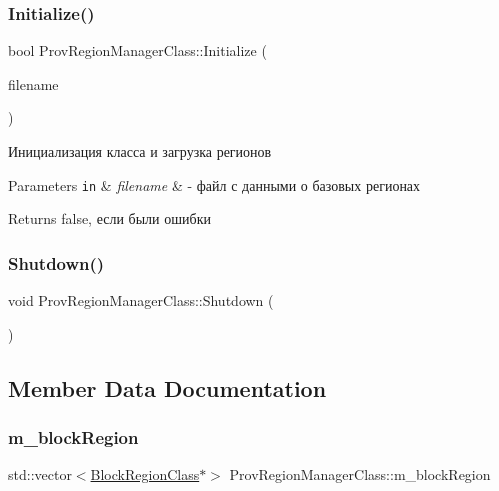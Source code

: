 \subsubsection{\texorpdfstring{Initialize()}{Initialize()}}
{\footnotesize\ttfamily bool Prov\+Region\+Manager\+Class\+::\+Initialize (\begin{DoxyParamCaption}\item[{\hyperlink{class_path_class}{Path\+Class} $\ast$}]{filename }\end{DoxyParamCaption})}



Инициализация класса и загрузка регионов 


\begin{DoxyParams}[1]{Parameters}
\mbox{\tt in}  & {\em filename} & -\/ файл с данными о базовых регионах \\
\hline
\end{DoxyParams}
\begin{DoxyReturn}{Returns}
false, если были ошибки 
\end{DoxyReturn}
\mbox{\label{class_prov_region_manager_class_a524eb11df226ed26ff043fb241707892}} 
\subsubsection{\texorpdfstring{Shutdown()}{Shutdown()}}
{\footnotesize\ttfamily void Prov\+Region\+Manager\+Class\+::\+Shutdown (\begin{DoxyParamCaption}{ }\end{DoxyParamCaption})}



\subsection{Member Data Documentation}
\mbox{\label{class_prov_region_manager_class_a9efe4cf012f00b316ce05fe588454fcc}} 
\subsubsection{\texorpdfstring{m\+\_\+block\+Region}{m\_blockRegion}}
{\footnotesize\ttfamily std\+::vector$<$\hyperlink{class_block_region_class}{Block\+Region\+Class}$\ast$$>$ Prov\+Region\+Manager\+Class\+::m\+\_\+block\+Region\hspace{0.3cm}{\ttfamily [private]}}



